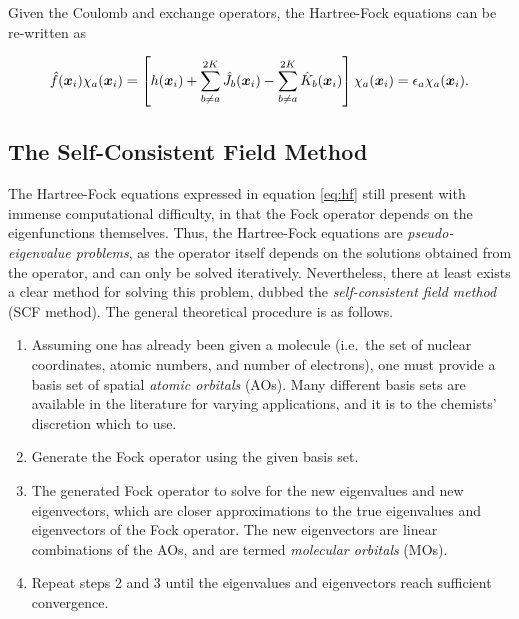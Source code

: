 Given the Coulomb and exchange operators, the Hartree-Fock equations can be
re-written as

\begin{equation}
\hat f(\bm x_i) \chi_a (\bm x_i) =
\left[ h(\bm x_i)
+ \sum_{b \neq a}^{2K} \hat J_b (\bm x_i)
- \sum_{b \neq a}^{2K} \hat K_b (\bm x_i) \right] \chi_a (\bm x_i)
= \epsilon_a \chi_a(\bm x_i).
\label{eq:hf}
\end{equation}

\subsection{The Self-Consistent Field Method}

The Hartree-Fock equations expressed in equation \ref{eq:hf} still present with
immense computational difficulty, in that the Fock operator depends on the
eigenfunctions themselves. Thus, the Hartree-Fock equations are
\emph{pseudo-eigenvalue problems}, as the operator itself depends on the
solutions obtained from the operator, and can only be solved iteratively.
Nevertheless, there at least exists a clear method for solving this problem,
dubbed the \emph{self-consistent field method} (SCF method). The general
theoretical procedure is as follows.

\begin{enumerate}

	\item Assuming one has already been given a molecule (i.e.\ the set of
		nuclear coordinates, atomic numbers, and number of electrons),
		one must provide a basis set of spatial \emph{atomic orbitals}
		(AOs). Many different basis sets are available in the literature
		for varying applications, and it is to the chemists' discretion
		which to use.

	\item Generate the Fock operator using the given basis set.

	\item The generated Fock operator to solve for the new eigenvalues and
		new eigenvectors, which are closer approximations to the true
		eigenvalues and eigenvectors of the Fock operator. The new
		eigenvectors are linear combinations of the AOs, and are termed
		\emph{molecular orbitals} (MOs).

	\item Repeat steps 2 and 3 until the eigenvalues and eigenvectors reach
		sufficient convergence.

\end{enumerate}

